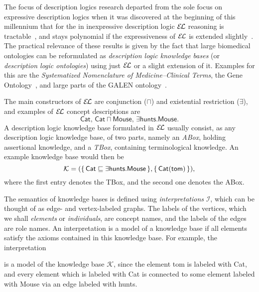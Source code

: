 The focus of description logics research departed from the sole focus on expressive
description logics when it was discovered at the beginning of this millennium that for the
in inexpressive description logic ${\mathcal{E}\kern-.3ex\mathcal{L}}$ reasoning is
tractable~\cite{DBLP:conf/ijcai/Baader03a,DBLP:conf/ecai/Brandt04}, and stays polynomial
if the expressiveness of ${\mathcal{E}\kern-.3ex\mathcal{L}}$ is extended
slightly~\cite{DBLP:conf/ijcai/BaaderBL05,BaaderEtAl-OWLED08DC}.  The practical relevance
of these results is given by the fact that large biomedical ontologies can be reformulated
as \emph{description logic knowledge bases} (or \emph{description logic ontologies}) using
just ${\mathcal{E}\kern-.3ex\mathcal{L}}$ or a slight extension of it.  Examples for this are the \emph{Systematized
  Nomenclature of Medicine--Clinical Terms}, the Gene Ontology~\cite{gene-ontology}, and
large parts of the GALEN ontology~\cite{Rector199475}.

The main constructors of ${\mathcal{E}\kern-.3ex\mathcal{L}}$ are conjunction ($\sqcap$) and existential restriction
($\exists$), and examples of ${\mathcal{E}\kern-.3ex\mathcal{L}}$ concept descriptions are
\begin{equation*}
  \mathsf{Cat},\, \mathsf{Cat} \sqcap \mathsf{Mouse},\, \exists \mathsf{hunts}. \mathsf{Mouse}.
\end{equation*}
A description logic knowledge base formulated in ${\mathcal{E}\kern-.3ex\mathcal{L}}$ usually consist, as any description
logic knowledge base, of two parts, namely an \emph{ABox}, holding assertional knowledge,
and a \emph{TBox}, containing terminological knowledge.  An example knowledge base would
then be
\begin{equation*}
  \mathcal{K} = ({\{\, \mathsf{Cat} \sqsubseteq \exists \mathsf{hunts}. \mathsf{Mouse} \,\}},
  {\{\, \mathsf{Cat}(\mathsf{tom}) \,\}}),
\end{equation*}
where the first entry denotes the TBox, and the second one denotes the ABox.

The semantics of knowledge bases is defined using \emph{interpretations} $\mathcal{I}$,
which can be thought of as edge- and vertex-labeled graphs.  The labels of the vertices,
which we shall \emph{elements} or \emph{individuals}, are concept names, and the labels of
the edges are role names.  An interpretation is a model of a knowledge base if all
elements satisfy the axioms contained in this knowledge base.  For example, the
interpretation
\begin{center}
\end{center}
is a model of the knowledge base $\mathcal{K}$, since the element \textsf{tom} is labeled
with \textsf{Cat}, and every element which is labeled with \textsf{Cat} is connected to
some element labeled with \textsf{Mouse} via an edge labeled with \textsf{hunts}.


